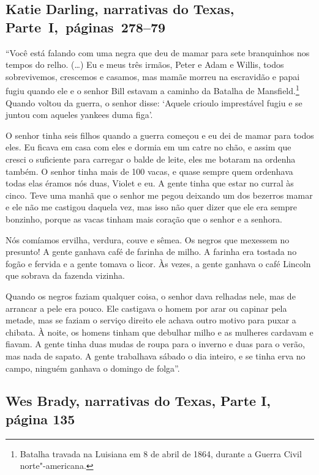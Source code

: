 \subsection{Katie Darling, narrativas do Texas, Parte~I,~páginas~278--79} \label{ref65}

``Você está falando com uma negra que deu de mamar para sete branquinhos
nos tempos do relho. (\ldots{}) Eu e meus três irmãos, Peter e Adam e
Willis, todos sobrevivemos, crescemos e casamos, mas mamãe morreu na
escravidão e papai fugiu quando ele e o senhor Bill estavam a caminho da
Batalha de Mansfield.\footnote{Batalha travada na Luisiana em 8 de abril de 1864,
durante a Guerra Civil norte"-americana.} Quando voltou da guerra, o senhor disse: `Aquele
crioulo imprestável fugiu e se juntou com aqueles yankees duma figa'.

O senhor tinha seis filhos quando a guerra começou e eu dei de mamar
para todos eles. Eu ficava em casa com eles e dormia em um catre no
chão, e assim que cresci o suficiente para carregar o balde de leite,
eles me botaram na ordenha também. O senhor tinha mais de 100 vacas, e
quase sempre quem ordenhava todas elas éramos nós duas, Violet e eu. A
gente tinha que estar no curral às cinco. Teve uma manhã que o senhor me
pegou deixando um dos bezerros mamar e ele não me castigou daquela vez,
mas isso não quer dizer que ele era sempre bonzinho, porque as vacas
tinham mais coração que o senhor e a senhora.

Nós comíamos ervilha, verdura, couve e sêmea. Os negros que mexessem no
presunto! A gente ganhava café de farinha de milho. A farinha era
tostada no fogão e fervida e a gente tomava o licor. Às vezes, a gente
ganhava o café Lincoln que sobrava da fazenda vizinha.

Quando os negros faziam qualquer coisa, o senhor dava relhadas nele, mas
de arrancar a pele era pouco. Ele castigava o homem por arar ou capinar
pela metade, mas se faziam o serviço direito ele achava outro motivo
para puxar a chibata. À noite, os homens tinham que debulhar milho e as
mulheres cardavam e fiavam. A gente tinha duas mudas de roupa para o
inverno e duas para o verão, mas nada de sapato. A gente trabalhava
sábado o dia inteiro, e se tinha erva no campo, ninguém ganhava o
domingo de folga''.

\subsection{Wes Brady, narrativas do Texas, Parte I, página 135} \label{ref31}

